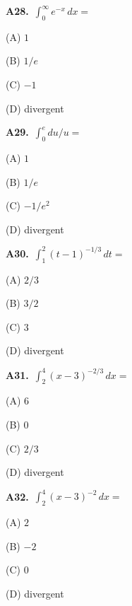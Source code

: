 \documentclass[11pt]{article}
\begin{document}
\bigskip\noindent\textbf{A28.}\ $\int_0^\infty e^{-x}\,dx=$
\begin{list}{}{\setlength{\leftmargin}{3em}\setlength{\labelwidth}{2.5em}\setlength{\itemsep}{0pt}\setlength{\topsep}{2pt}}
\item[(A)] $1$
\item[(B)] $1/e$
\item[(C)] $-1$
\item[(D)] divergent
\end{list}

\bigskip\noindent\textbf{A29.}\ $\int_0^e du/u=$
\begin{list}{}{\setlength{\leftmargin}{3em}\setlength{\labelwidth}{2.5em}\setlength{\itemsep}{0pt}\setlength{\topsep}{2pt}}
\item[(A)] $1$
\item[(B)] $1/e$
\item[(C)] $-1/e^2$
\item[(D)] divergent
\end{list}

\bigskip\noindent\textbf{A30.}\ $\int_1^2(t-1)^{-1/3}\,dt=$
\begin{list}{}{\setlength{\leftmargin}{3em}\setlength{\labelwidth}{2.5em}\setlength{\itemsep}{0pt}\setlength{\topsep}{2pt}}
\item[(A)] $2/3$
\item[(B)] $3/2$
\item[(C)] $3$
\item[(D)] divergent
\end{list}

\bigskip\noindent\textbf{A31.}\ $\int_2^4(x-3)^{-2/3}\,dx=$
\begin{list}{}{\setlength{\leftmargin}{3em}\setlength{\labelwidth}{2.5em}\setlength{\itemsep}{0pt}\setlength{\topsep}{2pt}}
\item[(A)] $6$
\item[(B)] $0$
\item[(C)] $2/3$
\item[(D)] divergent
\end{list}

\bigskip\noindent\textbf{A32.}\ $\int_2^4(x-3)^{-2}\,dx=$
\begin{list}{}{\setlength{\leftmargin}{3em}\setlength{\labelwidth}{2.5em}\setlength{\itemsep}{0pt}\setlength{\topsep}{2pt}}
\item[(A)] $2$
\item[(B)] $-2$
\item[(C)] $0$
\item[(D)] divergent
\end{list}
\end{document}
